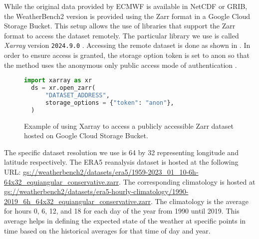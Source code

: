 While the original data provided by ECMWF is available in NetCDF or GRIB, the WeatherBench2 version is provided using the Zarr format in a Google Cloud Storage Bucket. This setup allows the use of libraries that support the Zarr format to access the dataset remotely. The particular library we use is called \emph{Xarray} version \verb|2024.9.0| \autocite{hoyer2017xarray,hoyerXarray2024}. Accessing the remote dataset is done as shown in . In order to ensure access is granted, the storage option token is set to anon so that the method uses the anonymous only public access mode of authentication \autocite{GCSFSGCSFs2023122post1+1g8e500c6dirty}.

\begin{figure}[H]
  \centering
  \begin{lstlisting}[language=Python]
  import xarray as xr
  ds = xr.open_zarr(
      "DATASET_ADDRESS",
      storage_options = {"token": "anon"},
  )
  \end{lstlisting}
  \caption{Example of using Xarray to access a publicly accessible Zarr dataset hosted on Google Cloud Storage Bucket.}\label{fig:access_remote_zarr}
\end{figure}

The specific dataset resolution we use is 64 by 32 representing longitude and latitude respectively. The ERA5 reanalysis dataset is hosted at the following URL\@: \url{gs://weatherbench2/datasets/era5/1959-2023_01_10-6h-64x32_equiangular_conservative.zarr}. The corresponding climatology is hosted at \url{gs://weatherbench2/datasets/era5-hourly-climatology/1990-2019_6h_64x32_equiangular_conservative.zarr}. The climatology is the average for hours 0, 6, 12, and 18 for each day of the year from 1990 until 2019. This average helps in defining the expected state of the weather at specific points in time based on the historical averages for that time of day and year.

